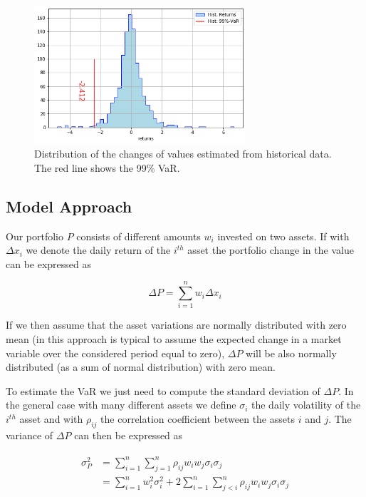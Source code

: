 \begin{figure}[htb]
	\centering
	\includegraphics[width=0.7\textwidth]{figures/historical_var.png}
	\caption{Distribution of the changes of values estimated from historical data. 
		The red line shows the 99\% VaR.}
	\label{fig:hist_var}
\end{figure}

\subsection{Model Approach}
\label{model-approach}

Our portfolio $P$ consists of different amounts $w_i$ invested on two assets. If with $\Delta x_i$ we denote the daily return of the $i^{th}$ asset the portfolio change in the value can be expressed as

\begin{equation}
\Delta P = \sum_{i=1}^n w_i \Delta x_i
\end{equation}

If we then assume that the asset variations are normally distributed with zero mean (in this approach is typical to assume the expected change in a market variable over the considered period equal to zero), \(\Delta P\) will be also normally distributed (as a sum of normal distribution) with zero mean.

To estimate the VaR we just need to compute the standard deviation of $\Delta P$. In the general case with many different assets we define $\sigma_i$ the daily volatility of the $i^{th}$ asset and with $\rho_{ij}$ the correlation coefficient between the assets $i$ and $j$. The variance of $\Delta P$ can then be expressed as

\begin{align}
\begin{split}
\sigma^2_P & = \sum_{i=1}^{n}\sum_{j=1}^{n}\rho_{ij}w_i w_j \sigma_i \sigma_j \\
& = \sum_{i=1}^{n} w_i^2 \sigma_i^2 + 2 \sum_{i=1}^{n}\sum_{j<i}^{n}\rho_{ij}w_i w_j \sigma_i \sigma_j 
\end{split}
\end{align}


